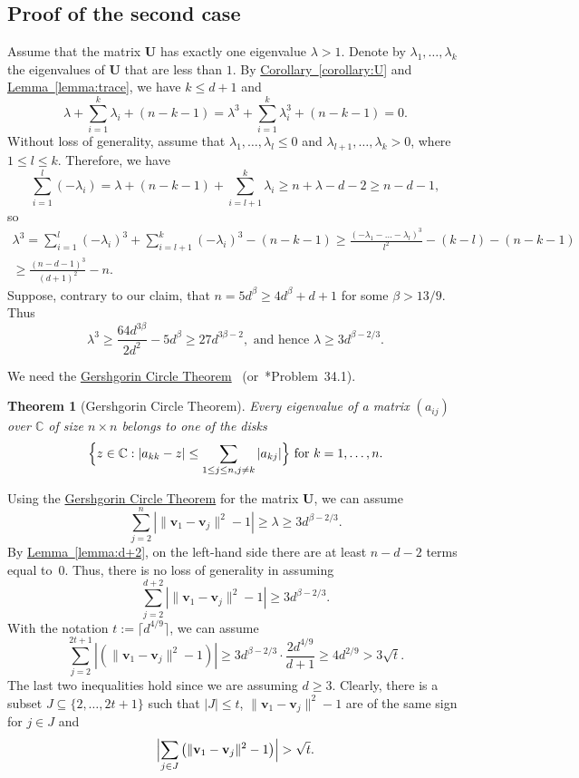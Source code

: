 \documentclass[a4paper, oneside, reqno, 12pt]{amsart}
\theoremstyle{plain}
\newtheorem{theorem}{Theorem}
\theoremstyle{definition}
\begin{document}
\subsection{Proof of the second case} Assume that the matrix $\mathbf U$ has exactly one eigenvalue $\lambda>1$. Denote by $\lambda_1, \dots, \lambda_k$ the eigenvalues of $\mathbf U$ that are less than $1$. By \hyperref[corollary:U]{Corollary~\ref*{corollary:U}} and \hyperref[lemma:trace]{Lemma~\ref{lemma:trace}}, we have $k\leq d+1$ and
\[
\lambda+\sum_{i=1}^{k}\lambda_i+(n-k-1)=
\lambda^3+\sum_{i=1}^{k}\lambda_i^3+(n-k-1)=0.
\]
Without loss of generality, assume that $\lambda_1,\dots, \lambda_l\leq 0$ and $\lambda_{l+1},\dots, \lambda_k>0$, where $1\leq l\leq k$. Therefore, we have
\[
\sum_{i=1}^{l}(-\lambda_i)=\lambda+(n-k-1)+\sum_{i=l+1}^{k}\lambda_i\geq n+\lambda-d-2\geq n-d-1,
\]
so
\begin{gather*}
\lambda^3=\sum_{i=1}^l(-\lambda_i)^3+\sum_{i=l+1}^k(-\lambda_i)^3-(n-k-1)\geq \frac{(-\lambda_1-\dots-\lambda_l)^3}{l^2}-(k-l)-(n-k-1)
\\
\geq\frac{(n-d-1)^3}{(d+1)^2}-n.
\end{gather*}
Suppose, contrary to our claim, that $n= 5d^{\beta}\geq 4 d^{\beta}+d+1$ for some $\beta> 13/9$. Thus
\[
\lambda^3\geq \frac{ 64d^{3\beta}}{2d^2}-5d^{\beta}\geq 27 d^{3\beta-2}, \text{ and hence } \lambda\geq 3d^{\beta-2/3}.
\]

We need the \hyperref[theorem:gershgorin]{Gershgorin Circle Theorem}~\cite{G31} (or~\cite{Pr94}*{Problem~34.1}).
\begin{theorem}[Gershgorin Circle Theorem]
	\label{theorem:gershgorin}
	Every eigenvalue of a matrix $(a_{ij})$ over $\mathbb C$ of size $n\times n$ belongs to one of the disks 
    \[
    \Bigl\{z\in\mathbb C:|a_{kk} - z| \leq 
    \sum_{1\leq j\leq n, j\ne k} |a_{kj}|\Bigr\} \text{ for } k=1,\dots, n.
    \]
\end{theorem}
Using the \hyperref[theorem:gershgorin]{Gershgorin Circle Theorem} for the matrix $\mathbf U$, we can assume
\[
\sum_{j=2}^n\left| \|\mathbf v_1-\mathbf v_j\|^2-1\right|\geq \lambda\geq 3d^{\beta-2/3}.
\]
By \hyperref[lemma:d+2]{Lemma~\ref*{lemma:d+2}}, on the left-hand side there are at least $n-d-2$ terms equal to~$0$. Thus, there is no loss of generality in assuming
\[
\sum_{j=2}^{d+2}\left|\|\mathbf v_1-\mathbf v_j\|^2-1\right|\geq 3d^{\beta-2/3}.
\]
With the notation $t:=\lceil d^{4/9}\rceil$, we can assume
\[
\sum_{j=2}^{2t+1}\left|\left(\|\mathbf v_1-\mathbf v_j\|^2-1\right)\right|\geq 3 d^{\beta-2/3}\cdot\frac{2 d^{4/9}}{d+1}\geq 4d^{2/9}> 3\sqrt{t}.
\]
The last two inequalities hold since we are assuming $d\geq 3$. Clearly, there is a subset $J\subseteq \{2,\dots, 2t+1\}$ such that $|J|\leq t$, $\|\mathbf v_1-\mathbf v_j\|^2-1$ are of the same sign for $j\in J$ and
\[
\Bigl|\sum_{j\in J}\left(\|\mathbf v_1-\mathbf v_j\|^2-1\right)\Bigr|>\sqrt{t}.
\]
\end{document}

